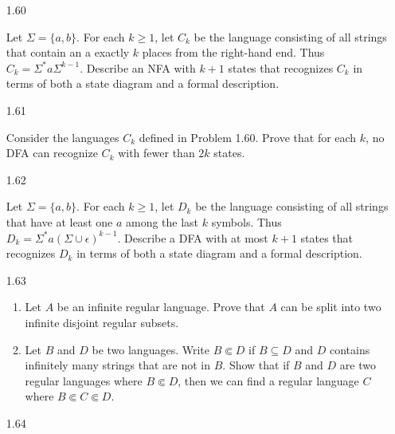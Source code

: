 \begin{enumerate}

      \item [1.60]
            
            
            Let $\Sigma =\{a,b\}$. For each $k \ge 1$, let $C_k$ be the language consisting of all strings that contain an a exactly $k$ places from the right-hand end. Thus $C_k = \Sigma^\ast a \Sigma^{k-1}$. Describe an NFA with $k+1$ states that recognizes $C_k$ in terms of both a state diagram and a formal description.
            
      \item [1.61]
            
            Consider the languages $C_k$ defined in Problem 1.60. Prove that for each $k$, no DFA can recognize $C_k$ with fewer than $2k$ states.
            
      \item [1.62]
            
            Let $\Sigma =\{a,b\}$. For each $k \ge 1$, let $D_k$ be the language consisting of all strings that have at least one $a$ among the last $k$ symbols. Thus $D_k = \Sigma^\ast a(\Sigma \cup \epsilon)^{k-1}$. Describe a DFA with at most $k+1$ states that recognizes $D_k$ in terms of both a state diagram and a formal description.
            
      \item [1.63]
            
            \begin{enumerate}
                  \item Let $A$ be an infinite regular language. Prove that $A$ can be split into two infinite disjoint regular subsets.
                  \item Let $B$ and $D$ be two languages. Write $B \Subset D$ if $B \subseteq D$ and $D$ contains infinitely many strings that are not in $B$. Show that if $B$ and $D$ are two regular languages where $B \Subset D$, then we can find a regular language $C$ where $B \Subset C \Subset D$.
            \end{enumerate}
            
      \item [1.64]
            

\end{enumerate}
